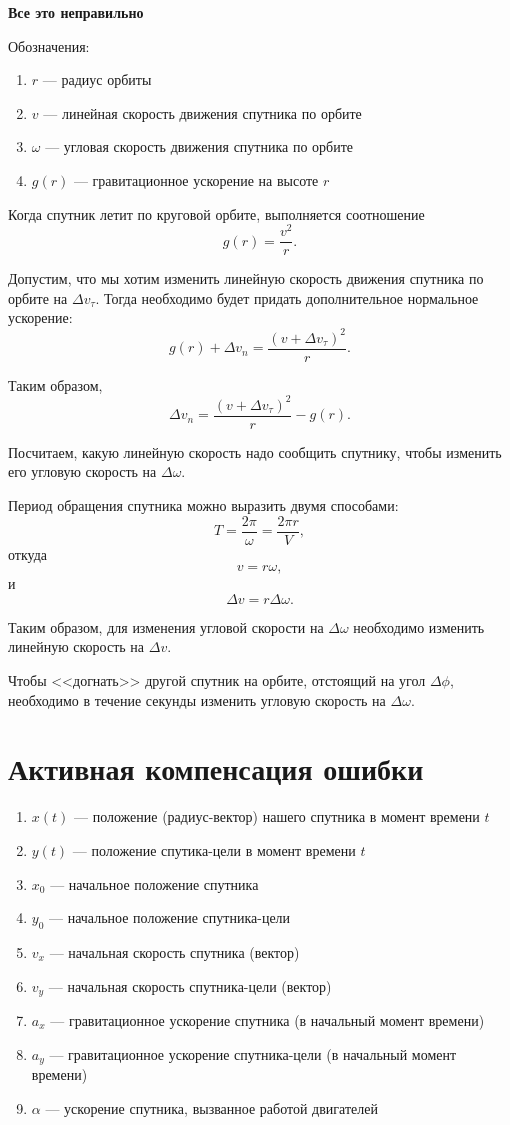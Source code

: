 \documentclass[a4paper]{article}
\begin{document}
\textbf{Все это неправильно}

Обозначения:
\begin{enumerate}
\item $r$ --- радиус орбиты
\item $v$ --- линейная скорость движения спутника по орбите
\item $\omega$ --- угловая скорость движения спутника по орбите
\item $g(r)$ --- гравитационное ускорение на высоте $r$
\end{enumerate}

Когда спутник летит по круговой орбите, выполняется соотношение
$$g(r)=\frac{v^2}{r}.$$

Допустим, что мы хотим изменить линейную скорость движения спутника по орбите на $\Delta v_\tau$. Тогда необходимо будет придать дополнительное нормальное ускорение:
$$g(r)+\Delta v_n=\frac{(v+\Delta v_\tau)^2}r.$$

Таким образом, $$\Delta v_n=\frac{(v+\Delta v_\tau)^2}r-g(r).$$

Посчитаем, какую линейную скорость надо сообщить спутнику, чтобы изменить его угловую скорость на $\Delta \omega$.

Период обращения спутника можно выразить двумя способами:
$$T=\frac{2\pi}{\omega}=\frac{2\pi r}{V},$$
откуда
$$v=r\omega,$$
и
$$\Delta v=r\Delta\omega.$$

Таким образом, для изменения угловой скорости на $\Delta\omega$ необходимо изменить линейную скорость на $\Delta v$.

Чтобы <<догнать>> другой спутник на орбите, отстоящий на угол $\Delta\phi$, необходимо в течение секунды изменить угловую скорость на $\Delta\omega$.

\section{Активная компенсация ошибки}

\begin{enumerate}
\item $x(t)$ --- положение (радиус-вектор) нашего спутника в момент времени $t$
\item $y(t)$ --- положение спутика-цели в момент времени $t$
\item $x_0$ --- начальное положение спутника
\item $y_0$ --- начальное положение спутника-цели
\item $v_x$ --- начальная скорость спутника (вектор)
\item $v_y$ --- начальная скорость спутника-цели (вектор)
\item $a_x$ --- гравитационное ускорение спутника (в начальный момент времени)
\item $a_y$ --- гравитационное ускорение спутника-цели (в начальный момент времени)
\item $\alpha$ --- ускорение спутника, вызванное работой двигателей
\end{enumerate}
\end{document}
